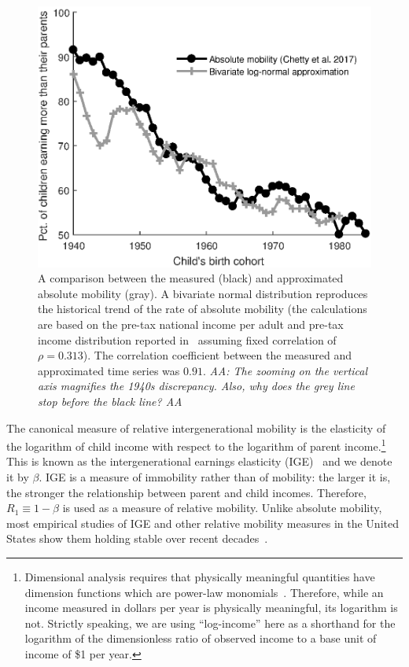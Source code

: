 \documentclass[12pt,a4paper]{article}
\newcommand{\red}[1]{{\color{red} #1}}
\newcommand{\AAA}[1]{\red{{\it AA: #1 AA}}}
\newcommand{\flabel}[1]{\label{fig:#1}}
\numberwithin{equation}{section}
\begin{document}
\begin{figure}[!htb]
\centering
\includegraphics[width=1.0\textwidth] {./figs/trend2.eps}
\caption{A comparison between the measured (black) and approximated absolute mobility (gray). A bivariate normal distribution reproduces the historical trend of the rate of absolute mobility (the calculations are based on the pre-tax national income per adult and pre-tax income distribution reported in~\citet{WID2017} assuming fixed correlation of $\rho=0.313$). The correlation coefficient between the measured and approximated time series was $0.91$. \AAA{The zooming on the vertical axis magnifies the 1940s discrepancy. Also, why does the grey line stop before the black line?} 
}
\flabel{trend}
\end{figure}

The canonical measure of relative intergenerational mobility is the elasticity of the logarithm of child income with respect to the logarithm of parent income.\footnote{Dimensional analysis requires that physically meaningful quantities have dimension functions which are power-law monomials~\citep{barenblatt2003}. Therefore, while an income measured in dollars per year is physically meaningful, its logarithm is not. Strictly speaking, we are using ``log-income'' here as a shorthand for the logarithm of the dimensionless ratio of observed income to a base unit of income of \$1 per year.} This is known as the intergenerational earnings elasticity (IGE)~\citep{mulligan1997parental,lee2009trends,chetty2014land} and we denote it by $\beta$. IGE is a measure of immobility rather than of mobility: the larger it is, the stronger the relationship between parent and child incomes. Therefore, $R_1 \equiv 1-\beta$ is used as a measure of relative mobility. Unlike absolute mobility, most empirical studies of IGE and other relative mobility measures in the United States show them holding stable over recent decades~\citep{lee2009trends,hauser2010intergenerational,chetty2014land,chetty2014united}. 
\end{document}
